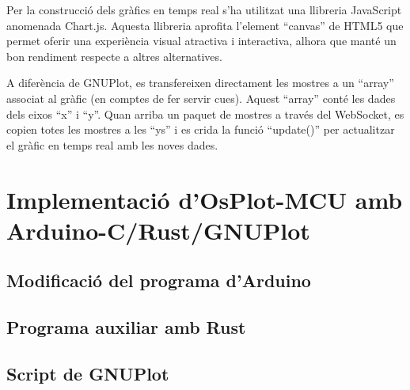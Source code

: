 \documentclass{tfgitic}[2023/06/30]
\begin{document}
Per la construcció
dels gràfics en temps real s'ha utilitzat una llibreria
JavaScript anomenada Chart.js. Aquesta llibreria aprofita
l'element ``canvas'' de HTML5 que permet oferir una
experiència visual atractiva i interactiva, alhora que manté
un bon rendiment respecte a altres alternatives.

A diferència de GNUPlot, es transfereixen directament les
mostres a un ``array'' associat al gràfic (en comptes de
fer servir cues). Aquest ``array'' conté les dades dels eixos
``x'' i ``y''. Quan arriba un paquet de mostres a través
del WebSocket, es copien totes les mostres a les ``ys'' i
es crida la funció ``update()'' per actualitzar el gràfic en
temps real amb les noves dades.

\chapter{Implementació d'OsPlot-MCU amb Arduino-C/Rust/GNUPlot}

\section{Modificació del programa d'Arduino}

\section{Programa auxiliar amb Rust}

\section{Script de GNUPlot}

\printbibliography
\end{document}
